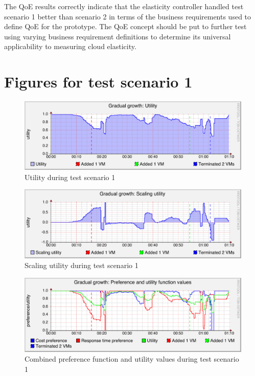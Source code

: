\documentclass[english]{tktltiki2}
\theoremstyle{definition}
\theoremstyle{remark}
\begin{document}
The QoE results correctly indicate that the elasticity controller handled test
scenario 1 better than scenario 2 in terms of the business requirements used
to define QoE for the prototype. The QoE concept should be put to further test
using varying business requirement definitions to determine its universal
applicability to measuring cloud elasticity.

\clearpage
\appendix

\section{Figures for test scenario 1}

\begin{figure}[htbp]
	\includegraphics[width=\textwidth]{images/utilitygraph-test21}
	\caption{Utility during test scenario 1}
	\label{fig:utilityScenario1}
\end{figure}

\begin{figure}[htbp]
	\includegraphics[width=\textwidth]{images/scalingutilitygraph-test21}
	\caption{Scaling utility during test scenario 1}
	\label{fig:scalingUtilityScenario1}
\end{figure}

\begin{figure}[htbp]
	\includegraphics[width=\textwidth]{images/preferencesgraph-test21}
	\caption{Combined preference function and utility values during test scenario 1}
	\label{fig:preferencesScenario1}
\end{figure}
\end{document}

